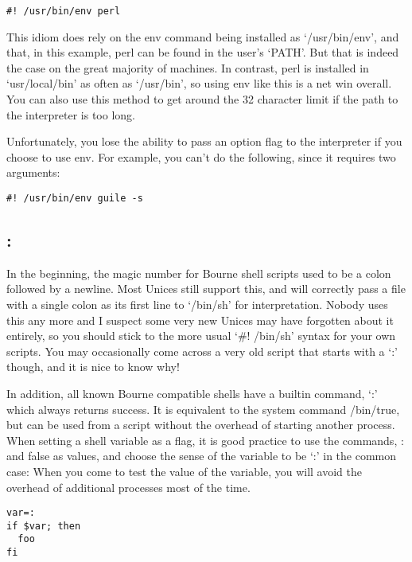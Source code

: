 \begin{Verbatim}[frame=single]
#! /usr/bin/env perl
\end{Verbatim}

This idiom does rely on the env command being installed as `/usr/bin/env', and that, in this example, perl can be found in the user's `PATH'. But that is indeed the case on the great majority of machines. In contrast, perl is installed in `usr/local/bin' as often as `/usr/bin', so using env like this is a net win overall. You can also use this method to get around the 32 character limit if the path to the interpreter is too long.

Unfortunately, you lose the ability to pass an option flag to the interpreter if you choose to use env. For example, you can't do the following, since it requires two arguments: 

\begin{Verbatim}[frame=single]
#! /usr/bin/env guile -s
\end{Verbatim}

\subsection{:}

In the beginning, the magic number for Bourne shell scripts used to be a colon followed by a newline. Most Unices still support this, and will correctly pass a file with a single colon as its first line to `/bin/sh' for interpretation. Nobody uses this any more and I suspect some very new Unices may have forgotten about it entirely, so you should stick to the more usual `\#! /bin/sh' syntax for your own scripts. You may occasionally come across a very old script that starts with a `:' though, and it is nice to know why!

In addition, all known Bourne compatible shells have a builtin command, `:' which always returns success. It is equivalent to the system command /bin/true, but can be used from a script without the overhead of starting another process. When setting a shell variable as a flag, it is good practice to use the commands, : and false as values, and choose the sense of the variable to be `:' in the common case: When you come to test the value of the variable, you will avoid the overhead of additional processes most of the time. 

\begin{Verbatim}[frame=single]
var=:
if $var; then
  foo
fi
\end{Verbatim}


